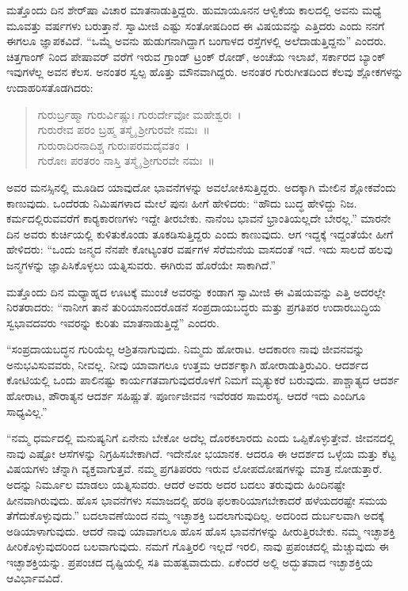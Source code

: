  ಮತ್ತೊಂದು ದಿನ ಶೇರ್‌ಷಾ ವಿಚಾರ ಮಾತನಾಡುತ್ತಿದ್ದರು. ಹುಮಾಯೂನನ ಆಳ್ವಿಕೆಯ ಕಾಲದಲ್ಲಿ ಅವನು ಮಧ್ಯೆ ಮೂವತ್ತು ವರ್ಷಗಳು ಬರುತ್ತಾನೆ. ಸ್ವಾಮೀಜಿ ಎಷ್ಟು ಸಂತೋಷದಿಂದ ಈ ವಿಷಯವನ್ನು ಎತ್ತಿದರು ಎಂದು ನನಗೆ ಈಗಲೂ ಜ್ಞಾಪಕವಿದೆ. “ಒಮ್ಮೆ ಅವನು ಹುಡುಗನಾಗಿದ್ದಾಗ ಬಂಗಾಳದ ರಸ್ತೆಗಳಲ್ಲಿ ಅಲೆದಾಡುತ್ತಿದ್ದನು” ಎಂದರು. ಚಿತ್ತಗಾಂಗ್ ನಿಂದ ಪೇಷಾವರ್ ವರೆಗೆ ಇರುವ ಗ್ರಾಂಡ್ ಟ್ರಂಕ್ ರೋಡ್, ಅಂಚೆಯ ಇಲಾಖೆ, ಸರ್ಕಾರದ ಬ್ಯಾಂಕ್ ಇವುಗಳೆಲ್ಲ ಅವನ ಕೆಲಸ. ಅನಂತರ ಸ್ವಲ್ಪ ಹೊತ್ತು ಮೌನವಾಗಿದ್ದರು. ಅನಂತರ ಗುರುಗೀತದಿಂದ ಕೆಲವು ಶ್ಲೋಕಗಳನ್ನು ಉದಾಹರಿಸತೊಡಗಿದರು:

\begin{verse}
ಗುರುರ್ಬ್ರಹ್ಮಾ ಗುರುರ್ವಿಷ್ಣುಃ ಗುರುರ್ದೇವೋ ಮಹೇಶ್ವರಃ~।\\ ಗುರುರೇವ ಪರಂ ಬ್ರಹ್ಮ ತಸ್ಮೈ ಶ‍್ರೀಗುರವೇ ನಮಃ~॥\\ ಗುರುರಾದಿರನಾದಿಶ್ಚ ಗುರುಃಪರಮದೈವತಂ~।\\ ಗುರೋಃ ಪರತರಂ ನಾಸ್ತಿ ತಸ್ಮೈ ಶ‍್ರೀಗುರವೇ ನಮಃ~॥
\end{verse}

 ಅವರ ಮನಸ್ಸಿನಲ್ಲಿ ಮೂಡಿದ ಯಾವುದೋ ಭಾವನೆಗಳನ್ನು ಅವಲೋಕಿಸುತ್ತಿದ್ದರು. ಅದಕ್ಕಾಗಿ ಮೇಲಿನ ಶ್ಲೋಕವೆಂದು ಕಾಣುವುದು. ಒಂದೆರಡು ನಿಮಿಷಗಳಾದ ಮೇಲೆ ಪುನಃ ಹೀಗೆ ಹೇಳಿದರು: “ಹೌದು ಬುದ್ಧ ಹೇಳಿದ್ದು ನಿಜ. ಕರ್ಮದಲ್ಲಿರುವವರೆಗೆ ಕಾರ‍್ಯಕಾರಣಗಳು ಇದ್ದೇ ತೀರಬೇಕು. ನಾನೆಂಬ ಭಾವನೆ ಭ್ರಾಂತಿಯಲ್ಲದೇ ಬೇರಲ್ಲ.” ಮಾರನೇ ದಿನ ಅವರು ಕುರ್ಚಿಯಲ್ಲಿ ಕುಳಿತುಕೊಂಡು ತೂಕಡಿಸುತ್ತಿದ್ದರು ಎಂದು ಕಾಣುವುದು. ಆಗ ಇದ್ದಕ್ಕೆ ಇದ್ದಂತೆಯೇ ಹೀಗೆ ಹೇಳಿದರು: “ಒಂದು ಜನ್ಮದ ನೆನಪೇ ಕೋಟ್ಯಂತರ ವರ್ಷಗಳ ಸೆರೆಮನೆಯ ವಾಸದಂತೆ ಇದೆ. ಇದು ಸಾಲದೆ ಹಲವು ಜನ್ಮಗಳನ್ನು ಜ್ಞಾಪಿಸಿಕೊಳ್ಳಲು ಯತ್ನಿಸುವರು. ಈಗಿರುವ ಹೊರೆಯೇ ಸಾಕಾಗಿದೆ.” 

 ಮತ್ತೊಂದು ದಿನ ಮಧ್ಯಾಹ್ನದ ಊಟಕ್ಕೆ ಮುಂಚೆ ಅವರನ್ನು ಕಂಡಾಗ ಸ್ವಾಮೀಜಿ ಈ ವಿಷಯವನ್ನು ಎತ್ತಿ ಅದರಲ್ಲೇ ನಿರತರಾದರು: “ನಾನೀಗ ತಾನೆ ತುರಿಯಾನಂದರೊಡನೆ ಸಂಪ್ರದಾಯಬದ್ಧರು ಮತ್ತು ಪ್ರಗತಿಪರ ಉದಾರಬುದ್ಧಿಯ ಸ್ವಭಾವದವರು ಇವರನ್ನು ಕುರಿತು ಮಾತನಾಡುತ್ತಿದ್ದೆ” ಎಂದರು. 

 “ಸಂಪ್ರದಾಯಬದ್ಧನ ಗುರಿಯೆಲ್ಲ ಆಶ್ರಿತನಾಗುವುದು. ನಿಮ್ಮದು ಹೋರಾಟ. ಆದಕಾರಣ ನಾವು ಜೀವನವನ್ನು ಅನುಭವಿಸುವವರು, ನೀವಲ್ಲ. ನೀವು ಯಾವಾಗಲೂ ಉತ್ತಮ ಆದರ್ಶಕ್ಕಾಗಿ ಹೋರಾಡುತ್ತಿರುವಿರಿ. ಆದರ್ಶದ ಕೋಟಿಯಲ್ಲಿ ಒಂದು ಪಾಲಿನಷ್ಟು ಕಾರ್ಯಗತವಾಗುವುದರೊಳಗೆ ನಿಮಗೆ ಮೃತ್ಯುಕರೆ ಬರುವುದು. ಪಾಶ್ಚಾತ್ಯದ ಆದರ್ಶ ಹೋರಾಟ, ಪೌರಾತ್ಯನ ಆದರ್ಶ ಸಹಿಷ್ಣುತೆ. ಪೂರ್ಣಜೀವನ ಇವೆರಡರ ಸಾಮರಸ್ಯ. ಆದರೆ ಇದು ಎಂದಿಗೂ ಸಾಧ್ಯವಿಲ್ಲ.” 

 “ನಮ್ಮ ಧರ್ಮದಲ್ಲಿ ಮನುಷ್ಯನಿಗೆ ಏನೇನು ಬೇಕೋ ಅದೆಲ್ಲ ದೊರಕಲಾರದು ಎಂದು ಒಪ್ಪಿಕೊಳ್ಳುತ್ತೇವೆ. ಜೀವನದಲ್ಲಿ ನಾವು ಎಷ್ಟೋ ಆಸೆಗಳನ್ನು ನಿಗ್ರಹಿಸಬೇಕಾಗಿದೆ. ಇದೇನೋ ಭಯಾನಕ. ಆದರೂ ಈ ಆದರ್ಶದ ಒಳ್ಳೆಯ ಮತ್ತು ಕೆಟ್ಟ ವಿಷಯಗಳು ಚೆನ್ನಾಗಿ ವ್ಯಕ್ತವಾಗುತ್ತವೆ. ನಮ್ಮ ಪ್ರಗತಿಪರರು ಇರುವ ಲೋಪದೋಷಗಳನ್ನು ಮಾತ್ರ ನೋಡುತ್ತಾರೆ. ಅದನ್ನು ನಿರ್ಮೂಲ ಮಾಡಲು ಯತ್ನಿಸುವರು. ಆದರೆ ಅವರು ಅದರ ಬದಲು ತರುವುದು ಹಿಂದಿನಷ್ಟೇ ಹೀನವಾಗಿರುವುದು. ಹೊಸ ಭಾವನೆಗಳು ಸಮಾಜದಲ್ಲಿ ಹರಡಿ ಫಲಕಾರಿಯಾಗಬೇಕಾದರೆ ಹಳೆಯದರಷ್ಟೇ ಸಮಯ ತೆಗೆದುಕೊಳ್ಳುವುದು.” ಬದಲಾವಣೆಯಿಂದ ನಮ್ಮ ಇಚ್ಛಾಶಕ್ತಿ ಬದಲಾಗುವುದಿಲ್ಲ. ಅದರಿಂದ ದುರ್ಬಲವಾಗಿ ಅದಕ್ಕೆ ಅಡಿಯಾಳಾಗುವುದು. ಆದರೆ ನಾವು ಯಾವಾಗಲೂ ಹೊಸ ಹೊಸ ಭಾವನೆಗಳನ್ನು ಹೀರುತ್ತಿರಬೇಕು. ನಮ್ಮ ಇಚ್ಛಾಶಕ್ತಿ ಹೀರಿಕೊಳ್ಳುವುದರಿಂದ ಬಲವಾಗುವುದು. ನಮಗೆ ಗೊತ್ತಿರಲಿ ಇಲ್ಲದೆ ಇರಲಿ, ನಾವು ಪ್ರಪಂಚದಲ್ಲಿ ಮೆಚ್ಚುವುದು ಈ ಇಚ್ಛಾಶಕ್ತಿಯನ್ನು. ಪ್ರಪಂಚದ ದೃಷ್ಟಿಯಲ್ಲಿ ಸತಿ ಮಹತ್ವವಾದುದು. ಏಕೆಂದರೆ ಅಲ್ಲಿ ಅದ್ಭುತವಾದ ಇಚ್ಛಾಶಕ್ತಿಯ ಆವಿರ್ಭಾವವಿದೆ. 

